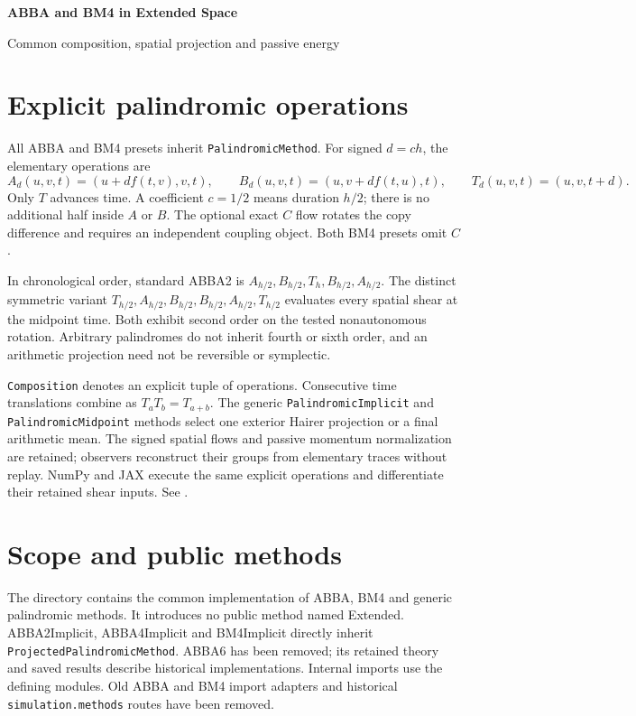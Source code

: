 \documentclass[11pt,a4paper]{article}
\begin{document}
\begin{center}
{\LARGE\bfseries\color{gcblue}ABBA and BM4 in Extended Space}\par
\vspace{0.35em}
{\large Common composition, spatial projection and passive energy}
\end{center}

\section*{Explicit palindromic operations}
All ABBA and BM4 presets inherit \texttt{PalindromicMethod}. For signed
$d=c h$, the elementary operations are
\[
 A_d(u,v,t)=(u+d f(t,v),v,t),\qquad
 B_d(u,v,t)=(u,v+d f(t,u),t),\qquad
 T_d(u,v,t)=(u,v,t+d).
\]
Only $T$ advances time. A coefficient $c=1/2$ means duration $h/2$;
there is no additional half inside $A$ or $B$. The optional exact $C$ flow
rotates the copy difference and requires an independent coupling object.
Both BM4 presets omit $C$.

In chronological order, standard ABBA2 is
$A_{h/2},B_{h/2},T_h,B_{h/2},A_{h/2}$.
The distinct symmetric variant
$T_{h/2},A_{h/2},B_{h/2},B_{h/2},A_{h/2},T_{h/2}$
evaluates every spatial shear at the midpoint time. Both exhibit second
order on the tested nonautonomous rotation. Arbitrary palindromes do not
inherit fourth or sixth order, and an arithmetic projection need not be
reversible or symplectic.

\texttt{Composition} denotes an explicit tuple of operations.
Consecutive time translations combine as $T_a T_b=T_{a+b}$.
The generic \texttt{PalindromicImplicit} and \texttt{PalindromicMidpoint}
methods select one exterior Hairer projection or a final arithmetic mean.
The signed spatial flows and passive momentum normalization are retained;
observers reconstruct their groups from elementary traces without replay. NumPy and JAX execute the same
explicit operations and differentiate their retained shear inputs.
See .


\section{Scope and public methods}
The directory  contains the common
implementation of ABBA, BM4 and generic palindromic methods. It introduces no public
method named Extended. ABBA2Implicit, ABBA4Implicit and BM4Implicit directly
inherit \texttt{ProjectedPalindromicMethod}. ABBA6 has been removed; its
retained theory and saved results describe historical implementations.
Internal imports use the defining modules. Old ABBA and BM4 import adapters
and historical \texttt{simulation.methods} routes have been removed.
\end{document}
